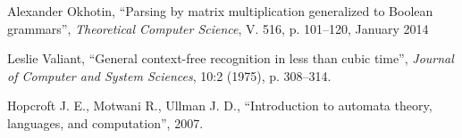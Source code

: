 \documentclass[a4paper,12pt]{article}  %
\theoremstyle{definition}
\theoremstyle{remark}
\begin{document}
\begin{thebibliography}{9}

  Alexander Okhotin,
  ``Parsing by matrix multiplication generalized to Boolean grammars'',
  \emph{Theoretical Computer Science},
  V. 516,
  p. 101--120,
  January 2014
  

  Leslie Valiant,
  ``General context-free recognition in less than cubic time'',
  \emph{Journal of Computer and System Sciences},
  10:2 (1975),
  p. 308--314.

  Hopcroft J. E., Motwani R., Ullman J. D.,
  ``Introduction to automata theory, languages, and computation'',
  2007.

\end{thebibliography}
\end{document}
